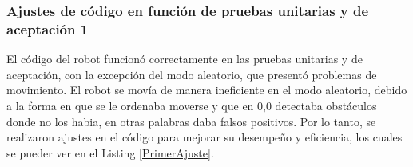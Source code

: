 \subsubsection{Ajustes de c\'odigo en funci\'on de pruebas unitarias y de aceptaci\'on 1}
\label{subsub:Ajustes de c\'odigo en funci\'on de pruebas unitarias y de aceptaci\'on}
    El c\'odigo del robot funcion\'o correctamente en las pruebas unitarias y de aceptaci\'on, 
    con la excepci\'on del modo aleatorio, que present\'o problemas de movimiento.
    El robot se mov\'ia de manera ineficiente en el modo aleatorio, debido a la forma en 
    que se le ordenaba moverse y que en 0,0 detectaba obst\'aculos donde no los habia, en otras palabras daba 
    falsos positivos. Por lo tanto, se realizaron ajustes en el c\'odigo para 
    mejorar su desempe\~no y eficiencia, los cuales se pueder ver en el Listing \ref{PrimerAjuste}.
